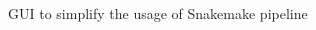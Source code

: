 \documentclass{beamer}
\begin{document}
\begin{frame}{GUI to simplify the usage of Snakemake pipeline}
    \begin{columns}
        \begin{column}{0.5\textwidth}



\end{column}
\end{columns}
\end{frame}
\end{document}
